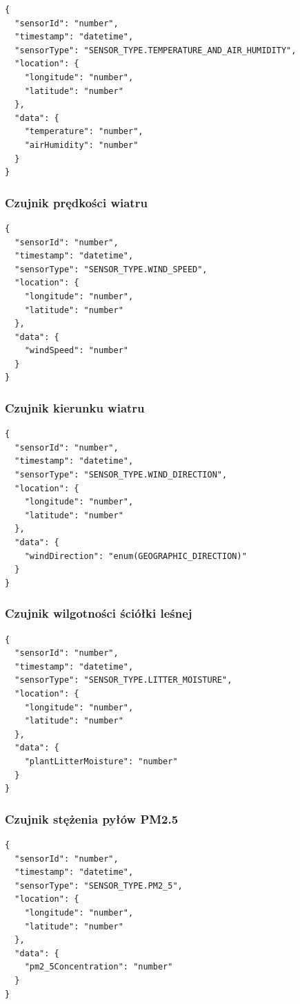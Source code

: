 \begin{verbatim}
{
  "sensorId": "number",
  "timestamp": "datetime",
  "sensorType": "SENSOR_TYPE.TEMPERATURE_AND_AIR_HUMIDITY",
  "location": {
    "longitude": "number",
    "latitude": "number"
  },
  "data": {
    "temperature": "number",
    "airHumidity": "number"
  }
}
\end{verbatim}

\subsubsection*{Czujnik prędkości wiatru}

\begin{verbatim}
{
  "sensorId": "number",
  "timestamp": "datetime",
  "sensorType": "SENSOR_TYPE.WIND_SPEED",
  "location": {
    "longitude": "number",
    "latitude": "number"
  },
  "data": {
    "windSpeed": "number"
  }
}
\end{verbatim}

\subsubsection*{Czujnik kierunku wiatru}

\begin{verbatim}
{
  "sensorId": "number",
  "timestamp": "datetime",
  "sensorType": "SENSOR_TYPE.WIND_DIRECTION",
  "location": {
    "longitude": "number",
    "latitude": "number"
  },
  "data": {
    "windDirection": "enum(GEOGRAPHIC_DIRECTION)"
  }
}
\end{verbatim}

\subsubsection*{Czujnik wilgotności ściółki leśnej}

\begin{verbatim}
{
  "sensorId": "number",
  "timestamp": "datetime",
  "sensorType": "SENSOR_TYPE.LITTER_MOISTURE",
  "location": {
    "longitude": "number",
    "latitude": "number"
  },
  "data": {
    "plantLitterMoisture": "number"
  }
}
\end{verbatim}

\subsubsection*{Czujnik stężenia pyłów PM2.5}

\begin{verbatim}
{
  "sensorId": "number",
  "timestamp": "datetime",
  "sensorType": "SENSOR_TYPE.PM2_5",
  "location": {
    "longitude": "number",
    "latitude": "number"
  },
  "data": {
    "pm2_5Concentration": "number"
  }
}
\end{verbatim}

